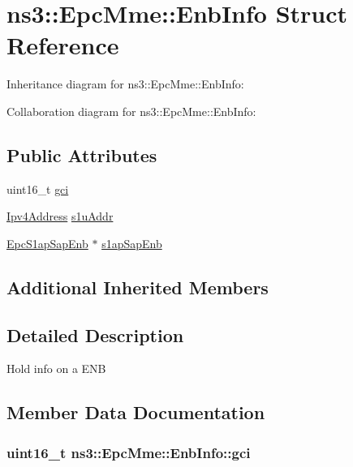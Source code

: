 \hypertarget{structns3_1_1EpcMme_1_1EnbInfo}{}\section{ns3\+:\+:Epc\+Mme\+:\+:Enb\+Info Struct Reference}
\label{structns3_1_1EpcMme_1_1EnbInfo}


Inheritance diagram for ns3\+:\+:Epc\+Mme\+:\+:Enb\+Info\+:


Collaboration diagram for ns3\+:\+:Epc\+Mme\+:\+:Enb\+Info\+:
\subsection*{Public Attributes}
\begin{DoxyCompactItemize}
\item 
uint16\+\_\+t \hyperlink{structns3_1_1EpcMme_1_1EnbInfo_af0b2cc96111fab13081cd01d600192a9}{gci}
\item 
\hyperlink{classns3_1_1Ipv4Address}{Ipv4\+Address} \hyperlink{structns3_1_1EpcMme_1_1EnbInfo_aa3544a110469530c6366c49ebb3eebf9}{s1u\+Addr}
\item 
\hyperlink{classns3_1_1EpcS1apSapEnb}{Epc\+S1ap\+Sap\+Enb} $\ast$ \hyperlink{structns3_1_1EpcMme_1_1EnbInfo_a0e7b8da423e29e057cefbc77a2db759f}{s1ap\+Sap\+Enb}
\end{DoxyCompactItemize}
\subsection*{Additional Inherited Members}


\subsection{Detailed Description}
Hold info on a E\+NB 

\subsection{Member Data Documentation}
\subsubsection[{\texorpdfstring{gci}{gci}}]{\setlength{\rightskip}{0pt plus 5cm}uint16\+\_\+t ns3\+::\+Epc\+Mme\+::\+Enb\+Info\+::gci}\hypertarget{structns3_1_1EpcMme_1_1EnbInfo_af0b2cc96111fab13081cd01d600192a9}{}\label{structns3_1_1EpcMme_1_1EnbInfo_af0b2cc96111fab13081cd01d600192a9}
